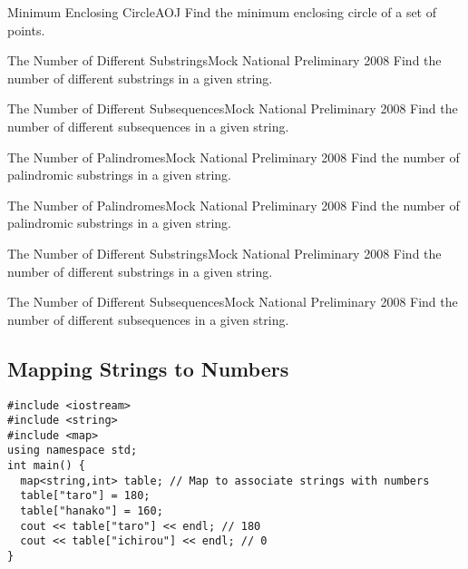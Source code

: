 \begin{pbox}{Minimum Enclosing Circle}{AOJ}
Find the minimum enclosing circle of a set of points.

\end{pbox}

\begin{pbox}{The Number of Different Substrings}{Mock National Preliminary 2008}
Find the number of different substrings in a given string.

\end{pbox}

\begin{pbox}{The Number of Different Subsequences}{Mock National Preliminary 2008}
Find the number of different subsequences in a given string.

\end{pbox}

\begin{pbox}{The Number of Palindromes}{Mock National Preliminary 2008}
Find the number of palindromic substrings in a given string.

\end{pbox}

\begin{pbox}{The Number of Palindromes}{Mock National Preliminary 2008}
Find the number of palindromic substrings in a given string.

\end{pbox}

\begin{pbox}{The Number of Different Substrings}{Mock National Preliminary 2008}
Find the number of different substrings in a given string.

\end{pbox}

\begin{pbox}{The Number of Different Subsequences}{Mock National Preliminary 2008}
Find the number of different subsequences in a given string.

\end{pbox}

\subsection{Mapping Strings to Numbers}

\begin{cbox}[emph={map}]
\begin{verbatim}
#include <iostream>
#include <string>
#include <map>
using namespace std;
int main() {
  map<string,int> table; // Map to associate strings with numbers
  table["taro"] = 180;
  table["hanako"] = 160;
  cout << table["taro"] << endl; // 180
  cout << table["ichirou"] << endl; // 0
}  
\end{verbatim}
\end{cbox}

